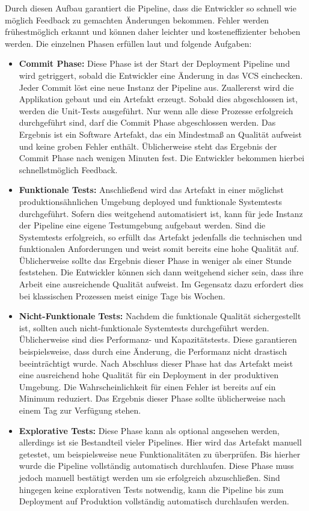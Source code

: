 Durch diesen Aufbau garantiert die Pipeline, dass die Entwickler so schnell wie möglich Feedback zu gemachten Änderungen bekommen. Fehler werden frühestmöglich erkannt und können daher leichter und kosteneffizienter behoben werden. Die einzelnen Phasen erfüllen laut \cite{humble2010} und \cite{wolff2014} folgende Aufgaben:

\begin{itemize}
	\item \textbf{Commit Phase:} Diese Phase ist der Start der Deployment Pipeline und wird getriggert, sobald die Entwickler eine Änderung in das VCS einchecken. Jeder Commit löst eine neue Instanz der Pipeline aus. Zuallererst wird die Applikation gebaut und ein Artefakt erzeugt. Sobald dies abgeschlossen ist, werden die Unit-Tests ausgeführt. Nur wenn alle diese Prozesse erfolgreich durchgeführt sind, darf die Commit Phase abgeschlossen werden. Das Ergebnis ist ein Software Artefakt, das ein Mindestmaß an Qualität aufweist und keine groben Fehler enthält. Üblicherweise steht das Ergebnis der Commit Phase nach wenigen Minuten fest. Die Entwickler bekommen hierbei schnellstmöglich Feedback.
	\item \textbf{Funktionale Tests:} Anschließend wird das Artefakt in einer möglichst produktionsähnlichen Umgebung deployed und funktionale Systemtests durchgeführt. Sofern dies weitgehend automatisiert ist, kann für jede Instanz der Pipeline eine eigene Testumgebung aufgebaut werden. Sind die Systemtests erfolgreich, so erfüllt das Artefakt jedenfalls die technischen und funktionalen Anforderungen und weist somit bereits eine hohe Qualität auf. Üblicherweise sollte das Ergebnis dieser Phase in weniger als einer Stunde feststehen. Die Entwickler können sich dann weitgehend sicher sein, dass ihre Arbeit eine ausreichende Qualität aufweist. Im Gegensatz dazu erfordert dies bei klassischen Prozessen meist einige Tage bis Wochen.
	\item \textbf{Nicht-Funktionale Tests:} Nachdem die funktionale Qualität sichergestellt ist, sollten auch nicht-funktionale Systemtests durchgeführt werden. Üblicherweise sind dies Performanz- und Kapazitätstests. Diese garantieren beispielsweise, dass durch eine Änderung, die Performanz nicht drastisch beeinträchtigt wurde. Nach Abschluss dieser Phase hat das Artefakt meist eine ausreichend hohe Qualität für ein Deployment in der produktiven Umgebung. Die Wahrscheinlichkeit für einen Fehler ist bereits auf ein Minimum reduziert. Das Ergebnis dieser Phase sollte üblicherweise nach einem Tag zur Verfügung stehen.
	\item \textbf{Explorative Tests:} Diese Phase kann als optional angesehen werden, allerdings ist sie Bestandteil vieler Pipelines. Hier wird das Artefakt manuell getestet, um beispielsweise neue Funktionalitäten zu überprüfen. Bis hierher wurde die Pipeline vollständig automatisch durchlaufen. Diese Phase muss jedoch manuell bestätigt werden um sie erfolgreich abzuschließen. Sind hingegen keine explorativen Tests notwendig, kann die Pipeline bis zum Deployment auf Produktion vollständig automatisch durchlaufen werden.

\end{itemize}

